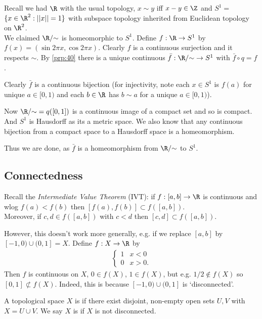 \begin{example}
Recall we had $\R$ with the usual topology, $x\sim y$ iff $x-y\in \Z$ and $S^1= $ $ \Set{x\in \R^2}{||x||=1}$ with subspace topology inherited from Euclidean topology on $\R^2$. \\
We claimed $\R/ {\sim}$ is homeomorphic to $S^1$. Define $f:\R \to S^1$ by $f(x) = (\sin 2\pi x, \cos 2\pi x)$.
Clearly $f$ is a continuous surjection and it respects $\sim$.
By \cref{prp:40} there is a unique continuous $\bar{f}: \R/ {\sim} \to S^1$ with $\bar{f}\circ q = f$.

Clearly $\bar{f}$ is a continuous bijection (for injectivity, note each $x\in S^1$ is $f(a)$ for unique $a\in[0,1)$ and each $b\in \R$ has $b\sim a$ for a unique $a\in[0,1)$).

Now $\R/ {\sim} = q([0,1])$ is a continuous image of a compact set and so is compact. And $S^1$ is Hausdorff as its a metric space.
We also know that any continuous bijection from a compact space to a Hausdorff space is a homeomorphism.

Thus we are done, as $\bar{f}$ is a homeomorphism from $\R/ {\sim}$ to $S^1$.
\end{example}

\subsection{Connectedness}

Recall the \emph{Intermediate Value Theorem} (IVT): if $f:[a,b]\to \R$ is continuous and wlog $f(a)<f(b)$ then $[f(a),f(b)]\subset f([a,b])$. \\
Moreover, if $c,d \in f([a,b])$ with $c<d$ then $[c,d]\subset f([a,b])$.

However, this doesn't work more generally, e.g. if we replace $[a,b]$ by $[-1,0)\cup (0,1] = X$. Define $f:X\to \R$ by \begin{align*}
    \begin{cases}
        1 & x<0\\
        0 & x>0.
    \end{cases}
\end{align*}
Then $f$ is continuous on $X$, $0\in f(X)$, $1\in f(X)$, but e.g. $1/2 \not\in f(X)$ so $[0,1] \not\subset f(X)$. Indeed, this is because $[-1,0)\cup (0,1]$ is `disconnected'.

\begin{definition}[Connectedness]
A topological space $X$ is  if there exist disjoint, non-empty open sets $U,V$ with $X = U\cup V$.
We say $X$ is  if $X$ is not disconnected.
\end{definition}

